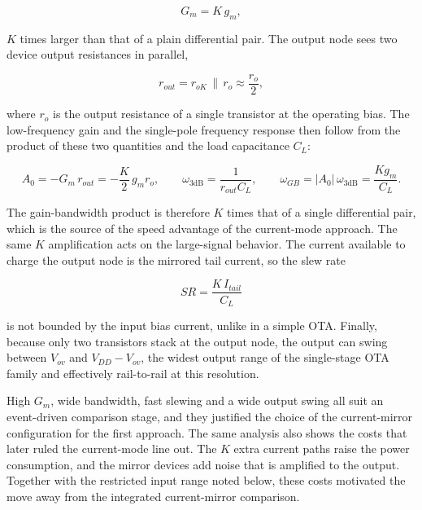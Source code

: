 \begin{equation}
    G_m = K\,g_m,
    \label{eq:gm_cm}
\end{equation}

\noindent
$K$ times larger than that of a plain differential pair. The output node sees
two device output resistances in parallel,

\begin{equation}
    r_{out} = r_{oK} \,\|\, r_{o} \approx \frac{r_{o}}{2},
    \label{eq:rout_cm}
\end{equation}

\noindent
where $r_o$ is the output resistance of a single transistor at the operating
bias. The low-frequency gain and the single-pole frequency response then
follow from the product of these two quantities and the load capacitance
$C_L$:

\begin{equation}
    A_0 = -G_m\,r_{out} = -\frac{K}{2}\,g_m r_{o},
    \qquad
    \omega_{3\mathrm{dB}} = \frac{1}{r_{out} C_L},
    \qquad
    \omega_{GB} = |A_0|\,\omega_{3\mathrm{dB}} = \frac{K g_m}{C_L}.
    \label{eq:freq_cm}
\end{equation}

\noindent
The gain-bandwidth product is therefore $K$ times that of a single
differential pair, which is the source of the speed advantage of the
current-mode approach. The same $K$ amplification acts on the large-signal
behavior. The current available to charge the output node is the mirrored
tail current, so the slew rate

\begin{equation}
    SR = \frac{K\,I_{tail}}{C_L}
    \label{eq:sr_cm}
\end{equation}

\noindent
is not bounded by the input bias current, unlike in a simple OTA. Finally,
because only two transistors stack at the output node, the output can swing
between $V_{ov}$ and $V_{DD} - V_{ov}$, the widest output range of the
single-stage OTA family and effectively rail-to-rail at this resolution.

High $G_m$, wide bandwidth, fast slewing and a wide output swing all suit an
event-driven comparison stage, and they justified the choice of the
current-mirror configuration for the first approach. The same analysis also
shows the costs that later ruled the current-mode line out. The $K$ extra
current paths raise the power consumption, and the mirror devices add noise that
is amplified to the output. Together with the restricted input range noted below,
these costs motivated the move away from the integrated current-mirror comparison.

